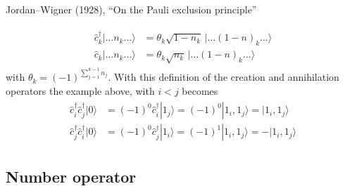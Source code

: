 \documentclass[letterpaper,10pt,english]{jupyterBook}
\begin{document}
\sphinxAtStartPar
{}%
\begin{footnote}[1]\sphinxAtStartFootnote
Jordan–Wigner (1928), “On the Pauli exclusion principle”
%
\end{footnote}
\begin{equation*}
\begin{split}\begin{aligned}
\hat c^\dagger_k|\dots n_k\dots\rangle & = \theta_k\sqrt{1-n_k}\,|\dots(1-n)_k\dots\rangle \\
\hat c_k|\dots n_k\dots\rangle & = \theta_k\sqrt{n_k}\,|\dots(1-n)_k\dots\rangle
\end{aligned}\end{split}
\end{equation*}
\sphinxAtStartPar
with \(\theta_k=(-1)^{\sum_{j=1}^{k-1} n_j}\). With this definition of the creation and annihilation operators the example above, with \(i < j\) becomes
\begin{equation*}
\begin{split}\begin{aligned}
  \hat{c}_i^\dagger \hat{c}_j^\dagger | 0 \rangle & = (-1)^0 \hat{c}_i^\dagger | 1_j \rangle = (-1)^0 | 1_i, 1_j \rangle =   | 1_i, 1_j \rangle \\
  \hat{c}_j^\dagger \hat{c}_i^\dagger | 0 \rangle & = (-1)^0 \hat{c}_j^\dagger | 1_i \rangle = (-1)^1 | 1_i, 1_j \rangle = - | 1_i, 1_j \rangle
\end{aligned}\end{split}
\end{equation*}

\subsection{Number operator}
\label{\detokenize{ch/quantum-mechanics/many-body/fermions:number-operator}}\label{\detokenize{ch/quantum-mechanics/many-body/fermions:quantum-mechanics-second-quantizazion-fermions-number}}
\end{document}
